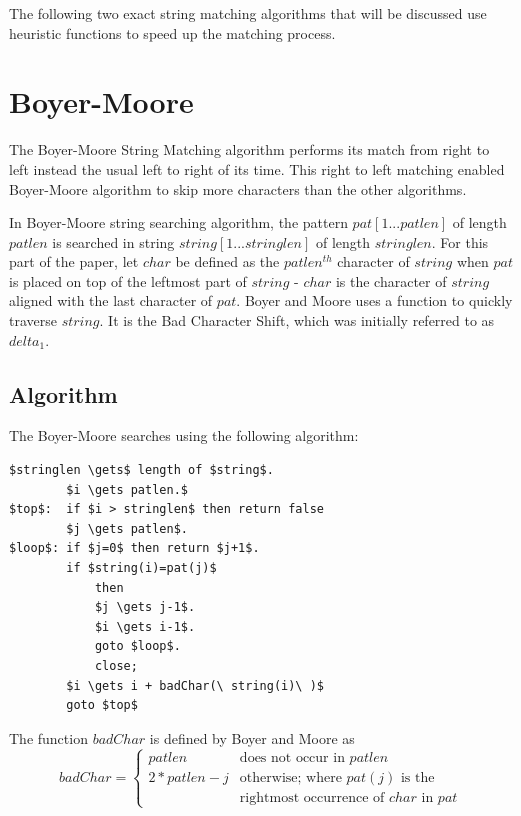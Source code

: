The following two exact string matching algorithms that will be discussed use heuristic functions to speed up the matching process.

\section{Boyer-Moore}		%
The Boyer-Moore String Matching algorithm performs its match from right to left instead the usual left to right of its time. This right to left matching enabled Boyer-Moore algorithm to skip more characters than the other algorithms\cite{boyerMoore}.

In Boyer-Moore string searching algorithm, the pattern $pat[1 ... patlen]$ of length $patlen$ is searched in string $string[1 ... stringlen]$ of length $stringlen$. For this part of the paper, let $char$ be defined as the $patlen^{th}$ character of $string$ when $pat$ is placed on top of the leftmost part of $string$ - $char$ is the character of $string$ aligned with the last character of $pat$. Boyer and Moore uses a function to quickly traverse $string$. It is the Bad Character Shift, which was initially referred to as $delta_1$.\cite{boyerMoore}

\subsection{Algorithm}
\cite{boyerMoore}The Boyer-Moore searches using the following algorithm:
\begin{lstlisting}[mathescape=true]
		$stringlen \gets$ length of $string$.
		$i \gets patlen.$
$top$:	if $i > stringlen$ then return false
		$j \gets patlen$.
$loop$:	if $j=0$ then return $j+1$.
		if $string(i)=pat(j)$
			then
			$j \gets j-1$.
			$i \gets i-1$.
			goto $loop$.
			close;
		$i \gets i + badChar(\ string(i)\ )$
		goto $top$
\end{lstlisting}

The function $badChar$ is defined by Boyer and Moore as\\

\begin{equation*}
  badChar =
  \begin{cases}
    patlen & \text{does not occur in $patlen$} \\
    2*patlen-j & \text{otherwise; where $pat(j)$ is the} \\
     & \text{rightmost occurrence of $char$ in $pat$}
  \end{cases}
\end{equation*}

